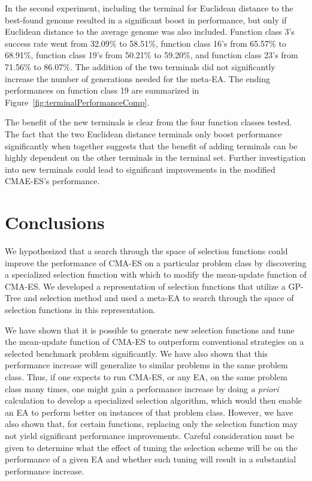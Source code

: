 \documentclass[sigconf]{acmart}
\begin{document}
In the second experiment, including the terminal for Euclidean distance to the best-found genome resulted in a significant boost in performance, but only if Euclidean distance to the average genome was also included. Function class 3's success rate went from 32.09\% to 58.51\%, function class 16's from 65.57\% to 68.91\%, function class 19's from 50.21\% to 59.20\%, and function class 23's from 71.56\% to 86.07\%. The addition of the two terminals did not significantly increase the number of generations needed for the meta-EA. The ending performances on function class 19 are summarized in Figure~\ref{fig:terminalPerformanceComp}.

The benefit of the new terminals is clear from the four function classes tested. The fact that the two Euclidean distance terminals only boost performance significantly when together suggests that the benefit of adding terminals can be highly dependent on the other terminals in the terminal set. Further investigation into new terminals could lead to significant improvements in the modified CMAE-ES's performance.

\section{Conclusions}
\label{Conclusion}
We hypothesized that a search through the space of selection functions could improve the performance of CMA-ES on a particular problem class by discovering a specialized selection function with which to modify the mean-update function of CMA-ES. We developed a representation of selection functions that utilize a GP-Tree and selection method and used a meta-EA to search through the space of selection functions in this representation. 

We have shown that it is possible to generate new selection functions and tune the mean-update function of CMA-ES to outperform conventional strategies on a selected benchmark problem significantly. We have also shown that this performance increase will generalize to similar problems in the same problem class. Thus, if one expects to run CMA-ES, or any EA, on the same problem class many times, one might gain a performance increase by doing \textit{a priori} calculation to develop a specialized selection algorithm, which would then enable an EA to perform better on instances of that problem class. However, we have also shown that, for certain functions, replacing only the selection function may not yield significant performance improvements. Careful consideration must be given to determine what the effect of tuning the selection scheme will be on the performance of a given EA and whether such tuning will result in a substantial performance increase. 



\end{document}
